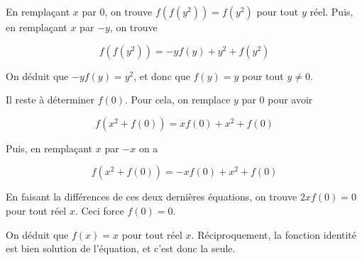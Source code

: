 \begin{sol}
En remplaçant $x$ par $0$, on trouve $f(f(y^2))=f(y^2)$ pour tout $y$ réel. Puis, en remplaçant $x$ par $-y$, on trouve 

\[f(f(y^2))= -yf(y)+y^2+f(y^2)\]

On déduit que $-yf(y)=y^2$, et donc que $f(y)=y$ pour tout $y\neq 0$. 

\medskip

Il reste à déterminer $f(0)$. Pour cela, on remplace $y$ par $0$ pour avoir 

\[f(x^2+f(0))=xf(0)+x^2+f(0)\]

Puis, en remplaçant $x$ par $-x$ on a 

\[f(x^2+f(0))=-xf(0)+x^2+f(0)\]

En faisant la différences de ces deux dernières équations, on trouve $2xf(0)=0$ pour tout réel $x$. Ceci force $f(0)=0$. 

\medskip

On déduit que $f(x)=x$ pour tout réel $x$. Réciproquement, la fonction identité est bien solution de l'équation, et c'est donc la seule.
\end{sol}

